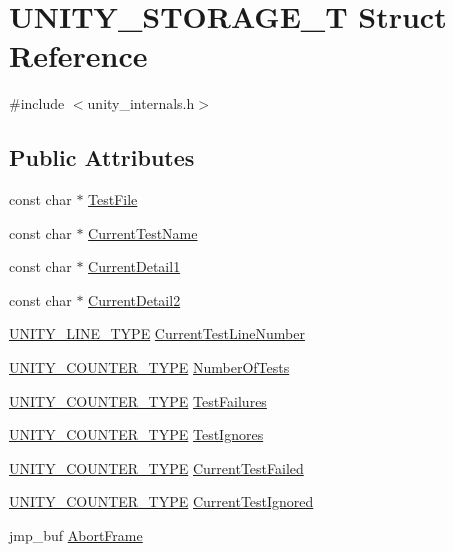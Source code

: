 \hypertarget{struct_u_n_i_t_y___s_t_o_r_a_g_e___t}{}\section{U\+N\+I\+T\+Y\+\_\+\+S\+T\+O\+R\+A\+G\+E\+\_\+T Struct Reference}
\label{struct_u_n_i_t_y___s_t_o_r_a_g_e___t}


{\ttfamily \#include $<$unity\+\_\+internals.\+h$>$}

\subsection*{Public Attributes}
\begin{DoxyCompactItemize}
\item 
const char $\ast$ \hyperlink{struct_u_n_i_t_y___s_t_o_r_a_g_e___t_a69613e2d9945fc1ce5a4848613828a1f}{Test\+File}
\item 
const char $\ast$ \hyperlink{struct_u_n_i_t_y___s_t_o_r_a_g_e___t_a0d7f8bf6c8a95ebe237d411f1fc7e345}{Current\+Test\+Name}
\item 
const char $\ast$ \hyperlink{struct_u_n_i_t_y___s_t_o_r_a_g_e___t_a21674715adf3d4d1ac7f0c459887cf9d}{Current\+Detail1}
\item 
const char $\ast$ \hyperlink{struct_u_n_i_t_y___s_t_o_r_a_g_e___t_a9d821447e216e215911e8726aa986eec}{Current\+Detail2}
\item 
\hyperlink{unity__internals_8h_a5c76dbcaafb6db2a52336cf5d4835290}{U\+N\+I\+T\+Y\+\_\+\+L\+I\+N\+E\+\_\+\+T\+Y\+PE} \hyperlink{struct_u_n_i_t_y___s_t_o_r_a_g_e___t_aaae2021491b025aabcc55edb3ca5bedf}{Current\+Test\+Line\+Number}
\item 
\hyperlink{unity__internals_8h_ab5186738706785ae0189b382e45911d9}{U\+N\+I\+T\+Y\+\_\+\+C\+O\+U\+N\+T\+E\+R\+\_\+\+T\+Y\+PE} \hyperlink{struct_u_n_i_t_y___s_t_o_r_a_g_e___t_a144a353d362e1c98bdbc963443b268dc}{Number\+Of\+Tests}
\item 
\hyperlink{unity__internals_8h_ab5186738706785ae0189b382e45911d9}{U\+N\+I\+T\+Y\+\_\+\+C\+O\+U\+N\+T\+E\+R\+\_\+\+T\+Y\+PE} \hyperlink{struct_u_n_i_t_y___s_t_o_r_a_g_e___t_a6a5463da7d0010ce4f9d80ff0647c7d4}{Test\+Failures}
\item 
\hyperlink{unity__internals_8h_ab5186738706785ae0189b382e45911d9}{U\+N\+I\+T\+Y\+\_\+\+C\+O\+U\+N\+T\+E\+R\+\_\+\+T\+Y\+PE} \hyperlink{struct_u_n_i_t_y___s_t_o_r_a_g_e___t_ab0ea61a39989b54885e805e6a35ff300}{Test\+Ignores}
\item 
\hyperlink{unity__internals_8h_ab5186738706785ae0189b382e45911d9}{U\+N\+I\+T\+Y\+\_\+\+C\+O\+U\+N\+T\+E\+R\+\_\+\+T\+Y\+PE} \hyperlink{struct_u_n_i_t_y___s_t_o_r_a_g_e___t_a075c6b1282c77d13bf2cc4501283da41}{Current\+Test\+Failed}
\item 
\hyperlink{unity__internals_8h_ab5186738706785ae0189b382e45911d9}{U\+N\+I\+T\+Y\+\_\+\+C\+O\+U\+N\+T\+E\+R\+\_\+\+T\+Y\+PE} \hyperlink{struct_u_n_i_t_y___s_t_o_r_a_g_e___t_a88913ed616a6eb58f3b45b281b7b1ff4}{Current\+Test\+Ignored}
\item 
jmp\+\_\+buf \hyperlink{struct_u_n_i_t_y___s_t_o_r_a_g_e___t_a4456e2d39fb2858a0406594a1606d21c}{Abort\+Frame}
\end{DoxyCompactItemize}


